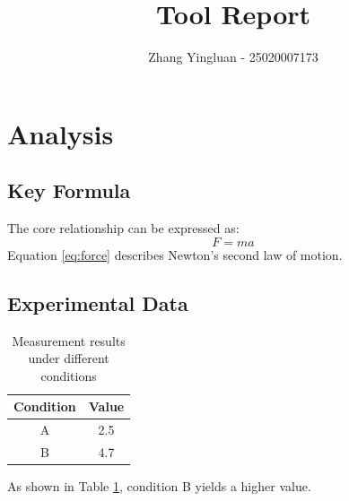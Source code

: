 \documentclass{article}
\begin{document}
\title{Tool Report}
\author{Zhang Yingluan - 25020007173}
\maketitle
\section{Analysis}
\subsection{Key Formula}
The core relationship can be expressed as:
\begin{equation}
F = ma
\label{eq:force}
\end{equation}
Equation \eqref{eq:force} describes Newton's second law of motion.
\subsection{Experimental Data}
\begin{table}[h]
\centering
\caption{Measurement results under different conditions}
\label{tab:results}
\begin{tabular}{|c|c|}
\hline
Condition & Value \\
\hline
A & 2.5 \\
B & 4.7 \\
\hline
\end{tabular}
\end{table}
As shown in Table \ref{tab:results}, condition B yields a higher value.
\end{document}
